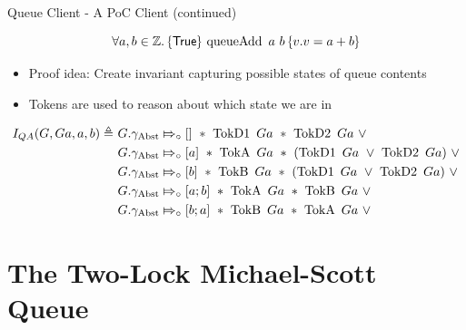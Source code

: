 \documentclass[9pt]{beamer}
\newcommand{\queueAdd}{\operatorname{queueAdd}}
\newcommand{\QueueAddInvariant}{I_{QA}}
\newcommand{\Qg}{G}
\newcommand{\QAg}{Ga}
\newcommand{\gabst}{\gname_{\mathrm{Abst}}}
\newcommand{\TokDo}[1]{\operatorname{TokD1} ~ #1}
\newcommand{\TokDoQAg}{\TokDo{\QAg}}
\newcommand{\TokDt}[1]{\operatorname{TokD2} ~ #1}
\newcommand{\TokDtQAg}{\TokDt{\QAg}}
\newcommand{\TokA}[1]{\operatorname{TokA} ~ #1}
\newcommand{\TokAQAg}{\TokA{\QAg}}
\newcommand{\TokB}[1]{\operatorname{TokB} ~ #1}
\newcommand{\TokBQAg}{\TokB{\QAg}}
\newcommand{\abstractstatefullfrag}[2]{#1 \Mapsto_{\circ} #2}
\begin{document}
\begin{frame}[fragile]{Queue Client - A PoC Client (continued)}
  
  \begin{lemma}\label{QueueSpecs:spec:queueadd}
    \begin{equation*}
      \All a, b \in \mathbb{Z} . \hoare{\TRUE}{\queueAdd \ a \ b}{v . v = a + b}
    \end{equation*}
  \end{lemma}

  \begin{itemize}
    \item Proof idea: Create invariant capturing possible states of queue contents
    \item Tokens are used to reason about which state we are in
  \end{itemize}
  
  \begin{definition}\label{QueueSpecs:queueadd:invariant}
    \begin{align*}
      \QueueAddInvariant(\Qg, \QAg, a, b) \eqdef~
      &\abstractstatefullfrag{\Qg.\gabst}{[]}~\star~\TokDoQAg~\star~\TokDtQAg~\lor\\
      &\abstractstatefullfrag{\Qg.\gabst}{[a]}~\star~\TokAQAg~\star~(\TokDoQAg~\lor~\TokDtQAg)~\lor\\
      &\abstractstatefullfrag{\Qg.\gabst}{[b]}~\star~\TokBQAg~\star~(\TokDoQAg~\lor~\TokDtQAg)~\lor\\
      &\abstractstatefullfrag{\Qg.\gabst}{[a; b]}~\star~\TokAQAg~\star~\TokBQAg~\lor\\
      &\abstractstatefullfrag{\Qg.\gabst}{[b; a]}~\star~\TokBQAg~\star~\TokAQAg~\lor
    \end{align*}
  \end{definition}
\end{frame}


\section{The Two-Lock Michael-Scott Queue}
\end{document}

